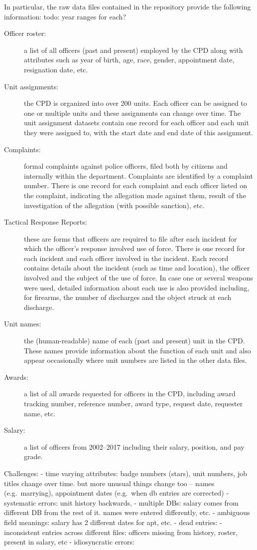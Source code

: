 In particular, the raw data files contained in the repository
provide the following information: {\color{red} todo: year ranges for each?}
\begin{description}
	\item[Officer roster:] a list of all officers (past and present) employed
		by the CPD along with attributes such as year of birth, age, race,
		gender, appointment date, resignation date, etc.
	\item[Unit assignments:] the CPD is organized into over 200 units.
		Each officer can be assigned to one or multiple units and these
		assignments can change over time. The unit assignment datasets contain
		one record for each officer and each unit they were assigned to, with
		the start date and end date of this assignment.
	\item[Complaints:] formal complaints against police officers, filed both by
		citizens and internally within the department. Complaints are
		identified by a complaint number. There is one record for each
		complaint and each officer listed on the complaint, indicating the
		allegation made against them, result of the investigation of the
		allegation (with possible sanction), etc.
	\item[Tactical Response Reports:] these are forms that officers are
		required to file after each incident for which the officer's response
		involved use of force. There is one record for each incident and each
		officer involved in the incident. Each record contains details about
		the incident (such as time and location), the officer involved and the
		subject of the use of force. In case one or several weapons were used,
		detailed information about each use is also provided including, for
		firearms, the number of discharges and the object struck at each
		discharge.
	\item[Unit names:] the (human-readable) name of each (past and present)
		unit in the CPD. These names provide information about the function of
		each unit and also appear occasionally where unit numbers are listed in
		the other data files.
	\item[Awards:] a list of all awards requested for officers in the CPD,
		including award tracking number, reference number, award type, request
		date, requester name, etc.
	\item[Salary:] a list of officers from 2002--2017 including their salary,
		position, and pay grade.
\end{description}

Challenges:
- time varying attributes: badge numbers (stars), unit numbers, job titles change over time. but 
more unusual things change too -- names (e.g.~marrying), appointment dates (e.g.~when db entries are corrected)
- systematic errors: unit history backwards, 
- multiple DBs: salary comes from different DB from the rest of it. names were entered differently, etc.
- ambiguous field meanings: salary has 2 different dates for apt, etc.
- dead entries: 
- inconsistent entries across different files: officers missing from history, roster, present in salary, etc
- idiosyncratic errors: 



